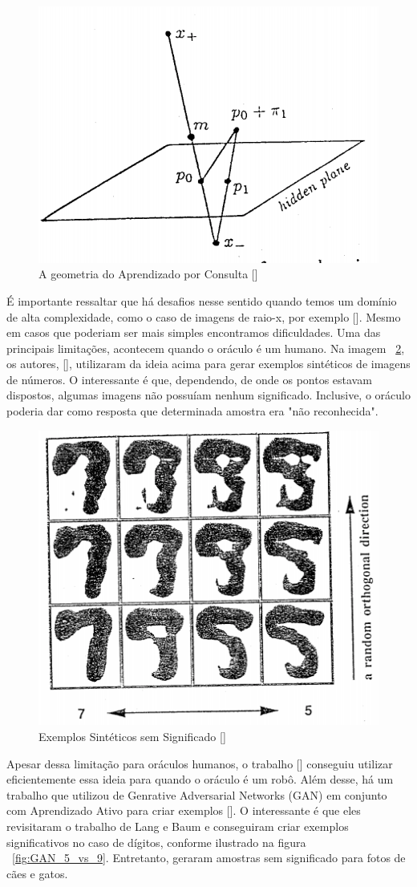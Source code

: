 \begin{figure}
  \centering
  \includegraphics[width=.4\textwidth]{figures/lang_baum_geometry_query_learning.png}
  \caption{A geometria do Aprendizado por Consulta [\cite{baum1992query}]}
  \label{fig:LangBaum_GeometryQueryLearning}
\end{figure}

É importante ressaltar que há desafios nesse sentido quando temos um domínio de alta complexidade, como o caso de imagens de raio-x, por exemplo [\cite{angluin1988queries}]. Mesmo em casos que poderiam ser mais simples encontramos dificuldades. Uma das principais limitações, acontecem quando o oráculo é um humano. Na imagem ~\ref{fig:LangBaum_5vs9Example}, os autores, [\cite{baum1992query}], utilizaram da ideia acima para gerar exemplos sintéticos de imagens de números. O interessante é que, dependendo, de onde os pontos estavam dispostos, algumas imagens não possuíam nenhum significado. Inclusive, o oráculo poderia dar como resposta que determinada amostra era "não reconhecida".

\begin{figure}
  \centering
  \includegraphics[width=.4\textwidth]{figures/lang_baum_5_vs_9_example.png}
  \caption{Exemplos Sintéticos sem Significado [\cite{baum1992query}]}
  \label{fig:LangBaum_5vs9Example}
\end{figure}

Apesar dessa limitação para oráculos humanos, o trabalho [\cite{king2004functional, king2009automation}] conseguiu utilizar eficientemente essa ideia para quando o oráculo é um robô. Além desse, há um trabalho que utilizou de Genrative Adversarial Networks (GAN) em conjunto com Aprendizado Ativo para criar exemplos [\cite{zhu2017generative}]. O interessante é que eles revisitaram o trabalho de Lang e Baum e conseguiram criar exemplos significativos no caso de dígitos, conforme ilustrado na figura ~\ref{fig:GAN_5_vs_9}. Entretanto, geraram amostras sem significado para fotos de cães e gatos. 

